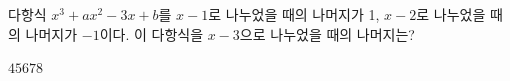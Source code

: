 다항식 $x^3+ax^2-3x+b$를 $x-1$로 나누었을 때의 나머지가 1, $x-2$로 나누었을 때의 나머지가 $-1$이다. 이 다항식을 $x-3$으로 나누었을 때의 나머지는? 
\begin{choices32}{$4$}{$5$}{$6$}{$7$}{$8$}\end{choices32}
